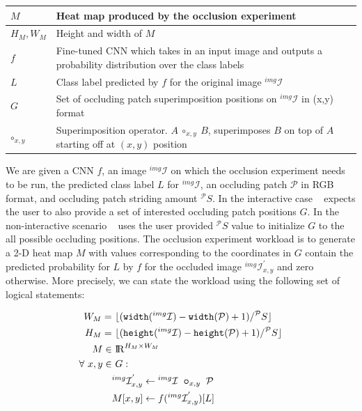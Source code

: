 \begin{table}[t]
{\begin{tabular}{p{2cm}p{7.5cm}}
    $M$ & Heat map produced by the occlusion experiment\\
    \midrule
    $H_M,W_M$ & Height and width of $M$\\
    \midrule
    $f$ & Fine-tuned CNN which takes in an input image and outputs a probability distribution over the class labels\\
    \midrule
    $L$ & Class label predicted by $f$ for the original image $^{img}\mathcal{I}$\\
    \midrule
    $G$ & Set of occluding patch superimposition positions on $^{img}\mathcal{I}$ in (x,y) format\\
    \midrule
    $\bm\circ_{x,y}$ & Superimposition operator. $A~\circ_{x,y}~B$, superimposes $B$ on top of $A$ starting off at $(x,y)$ position\\
    \bottomrule
  \end{tabular}}
\label{table:preliminaries_symbols}
\end{table}


We are given a CNN $f$, an image $^{img}\mathcal{I}$ on which the occlusion experiment needs to be run, the predicted class label $L$ for $^{img}\mathcal{I}$, an occluding patch $\mathcal{P}$ in RGB format, and occluding patch striding amount $^{\mathcal{P}}S$.
In the interactive case \system~ expects the user to also provide a set of interested occluding patch positions $G$.
In the non-interactive scenario \system~ uses the user provided $^\mathcal{P}S$ value to initialize $G$ to the all possible occluding positions.
The occlusion experiment workload is to generate a 2-D heat map $M$ with values corresponding to the coordinates in $G$ contain the predicted probability for $L$ by $f$ for the occluded image $^{img}\mathcal{I}^{'}_{x,y}$ and zero otherwise.
More precisely, we can state the workload using the following set of logical statements:


\begin{align}
\label{eqn:mheight}
W_M =&~ \lfloor(\texttt{width}(^{img}\mathcal{I}) - \texttt{width}(\mathcal{P}) + 1)/^\mathcal{P}S\rfloor\\
\label{eqn:mwidth}
H_M =&~ \lfloor(\texttt{height}(^{img}\mathcal{I}) - \texttt{height}(\mathcal{P}) + 1)/^\mathcal{P}S\rfloor\\
M \in&~ \mathcal{\rm I\!R}^{H_M \times W_M}\\
\forall~ x,y \in&~ G:\\
\label{eqn:patchimpose}
& ^{img}\mathcal{I}^{'}_{x,y} \leftarrow {}^{img}\mathcal{I} ~ \bm\circ_{x,y} ~ \mathcal{P} \\
\label{eqn:outputval}
& M[x,y] \leftarrow f(^{img}\mathcal{I}^{'}_{x,y})[L]
\end{align}




